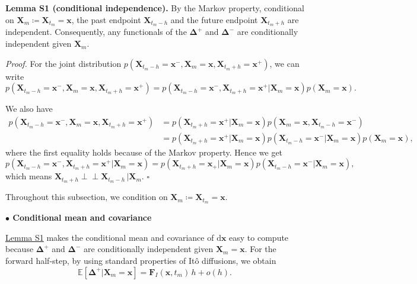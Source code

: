 \hypertarget{lem:S1}{}
\textbf{Lemma S1 (conditional independence).} By the Markov property, conditional on $\bm{X}_m\coloneq\bm{X}_{t_m}=\bm{x}$, the past endpoint $\bm{X}_{t_m-h}$ and the future endpoint $\bm{X}_{t_m+h}$ are independent. Consequently, any functionals of the $\bm\Delta^+$ and $\bm\Delta^-$ are conditionally independent given $\bm{X}_m$.

\textit{Proof.} For the joint distribution $p(\bm{X}_{t_m-h}=\bm{x}^-,\bm{X}_m=\bm{x},\bm{X}_{t_m+h}=\bm{x}^+)$, we can write
\begin{equation*}
    p(\bm{X}_{t_m-h}=\bm{x}^-,\bm{X}_m=\bm{x},\bm{X}_{t_m+h}=\bm{x}^+)=p(\bm{X}_{t_m-h}=\bm{x}^-,\bm{X}_{t_m+h}=\bm{x}^+|\bm{X}_m=\bm{x})p(\bm{X}_m=\bm{x}).
\end{equation*}

We also have
\begin{align*}
    p(\bm{X}_{t_m-h}=\bm{x}^-,\bm{X}_m=\bm{x},\bm{X}_{t_m+h}=\bm{x}^+)
    &=p(\bm{X}_{t_m+h}=\bm{x}^+|\bm{X}_m=\bm{x})p(\bm{X}_{m}=\bm{x},\bm{X}_{t_m-h}=\bm{x}^-)
    \\
    &=p(\bm{X}_{t_m+h}=\bm{x}^+|\bm{X}_m=\bm{x})p(\bm{X}_{t_m-h}=\bm{x}^-|\bm{X}_m=\bm{x})p(\bm{X}_{m}=\bm{x}),
\end{align*}
where the first equality holds because of the Markov property. Hence we get 
\begin{equation*}
    p(\bm{X}_{t_m-h}=\bm{x}^-,\bm{X}_{t_m+h}=\bm{x}^+|\bm{X}_m=\bm{x})=p(\bm{X}_{t_m+h}=\bm{x_+}|\bm{X}_m=\bm{x})p(\bm{X}_{t_m-h}=\bm{x}^-|\bm{X}_m=\bm{x}),
\end{equation*}
which means $\bm{X}_{t_m+h}\perp\!\!\!\perp\bm{X}_{t_m-h}\,|\bm{X}_m$. $\square$

Throughout this subsection, we condition on $\bm{X}_m \coloneq\bm{X}_{t_m}= \bm{x}$.

\bigskip
\noindent\textbf{$\bullet$ Conditional mean and covariance}

\hyperlink{lem:S1}{Lemma S1} makes the conditional mean and covariance of $\mathrm{d}\bm{x}$ easy to compute because $\bm\Delta^+$ and $\bm\Delta^-$ are conditionally independent given $\bm{X}_m=\bm{x}$.
For the forward half-step, by using standard properties of It\^{o} diffusions, we obtain
\begin{equation}
    \mathbb{E}[\bm\Delta^+|\bm{X}_m=\bm{x}]=
    \bm{F}_I(\bm{x},t_m)\,h+o(h).
    \label{seq:E_Delta^+}
\end{equation}

